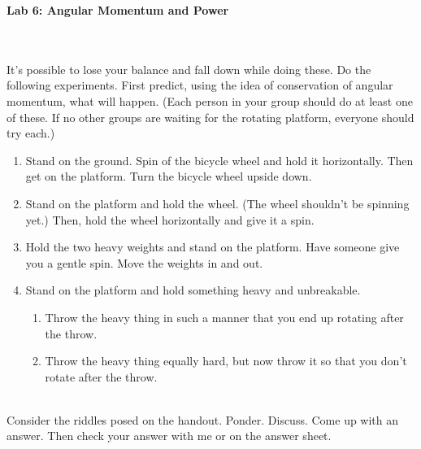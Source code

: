 \documentclass[12pt]{article}
\begin{document}
\pagestyle{empty}

\begin{center}
{\large {\bf Lab 6: Angular Momentum and Power}}\\
\smallskip 
\end{center}

\hspace{2mm}\\

\\
 
 It's possible to lose your balance and
fall down while doing these. Do the following experiments.  First
predict, using the idea of conservation of angular momentum, what will
happen. (Each person in your group should do at least one of these. If
no other groups are waiting for the rotating platform, everyone should
try each.)  
\begin{enumerate}
   \item Stand on the ground. Spin of the bicycle wheel and hold it
   horizontally. Then get on the platform. Turn the bicycle wheel
   upside down. 
   \item Stand on the platform and hold the wheel. (The wheel
   shouldn't be spinning yet.) Then, hold the wheel horizontally and
   give it a spin. 
   \item Hold the two heavy weights and stand on the platform. Have
   someone give you a gentle spin. Move the weights in and out. 
   \item Stand on the platform and hold something heavy and
   unbreakable. 
   \begin{enumerate}
   \item Throw the heavy thing in such a manner that you end up
     rotating after the throw. 
   \item Throw the heavy thing equally hard, but now throw it
     so that you don't rotate after the throw. \\ 
   \end{enumerate}
\end{enumerate}



\\

\noindent Consider the riddles posed on the handout.  Ponder.
Discuss.  Come up with an answer.  Then check your answer with me or
on the answer sheet.\\


\newpage
{}\\
\end{document}
